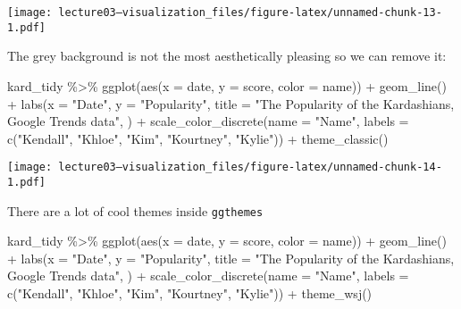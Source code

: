 \documentclass[
]{article}
\newenvironment{Shaded}{\begin{snugshade}}{\end{snugshade}}
\newcommand{\AttributeTok}[1]{\textcolor[rgb]{0.77,0.63,0.00}{#1}}
\newcommand{\FunctionTok}[1]{\textcolor[rgb]{0.00,0.00,0.00}{#1}}
\newcommand{\NormalTok}[1]{#1}
\newcommand{\SpecialCharTok}[1]{\textcolor[rgb]{0.00,0.00,0.00}{#1}}
\newcommand{\StringTok}[1]{\textcolor[rgb]{0.31,0.60,0.02}{#1}}
\begin{document}
\texttt{[image: lecture03---visualization\_files/figure-latex/unnamed-chunk-13-1.pdf]}

The grey background is not the most aesthetically pleasing so we can
remove it:

\begin{Shaded}
\begin{Highlighting}[]
\NormalTok{kard\_tidy }\SpecialCharTok{\%\textgreater{}\%} 
  \FunctionTok{ggplot}\NormalTok{(}\FunctionTok{aes}\NormalTok{(}\AttributeTok{x =}\NormalTok{ date, }\AttributeTok{y =}\NormalTok{ score, }\AttributeTok{color =}\NormalTok{ name)) }\SpecialCharTok{+}
  \FunctionTok{geom\_line}\NormalTok{() }\SpecialCharTok{+}
  \FunctionTok{labs}\NormalTok{(}\AttributeTok{x =} \StringTok{"Date"}\NormalTok{,}
       \AttributeTok{y =} \StringTok{"Popularity"}\NormalTok{,}
       \AttributeTok{title =} \StringTok{"The Popularity of the Kardashians, Google Trends data"}\NormalTok{,}
\NormalTok{       ) }\SpecialCharTok{+}
  \FunctionTok{scale\_color\_discrete}\NormalTok{(}\AttributeTok{name =} \StringTok{"Name"}\NormalTok{,}
                       \AttributeTok{labels =} \FunctionTok{c}\NormalTok{(}\StringTok{"Kendall"}\NormalTok{, }\StringTok{"Khloe"}\NormalTok{, }\StringTok{"Kim"}\NormalTok{, }\StringTok{"Kourtney"}\NormalTok{, }\StringTok{"Kylie"}\NormalTok{)) }\SpecialCharTok{+}
  \FunctionTok{theme\_classic}\NormalTok{()}
\end{Highlighting}
\end{Shaded}

\texttt{[image: lecture03---visualization\_files/figure-latex/unnamed-chunk-14-1.pdf]}

There are a lot of cool themes inside \texttt{ggthemes}

\begin{Shaded}
\begin{Highlighting}[]
\NormalTok{kard\_tidy }\SpecialCharTok{\%\textgreater{}\%} 
  \FunctionTok{ggplot}\NormalTok{(}\FunctionTok{aes}\NormalTok{(}\AttributeTok{x =}\NormalTok{ date, }\AttributeTok{y =}\NormalTok{ score, }\AttributeTok{color =}\NormalTok{ name)) }\SpecialCharTok{+}
  \FunctionTok{geom\_line}\NormalTok{() }\SpecialCharTok{+}
  \FunctionTok{labs}\NormalTok{(}\AttributeTok{x =} \StringTok{"Date"}\NormalTok{,}
       \AttributeTok{y =} \StringTok{"Popularity"}\NormalTok{,}
       \AttributeTok{title =} \StringTok{"The Popularity of the Kardashians, Google Trends data"}\NormalTok{,}
\NormalTok{       ) }\SpecialCharTok{+}
  \FunctionTok{scale\_color\_discrete}\NormalTok{(}\AttributeTok{name =} \StringTok{"Name"}\NormalTok{,}
                       \AttributeTok{labels =} \FunctionTok{c}\NormalTok{(}\StringTok{"Kendall"}\NormalTok{, }\StringTok{"Khloe"}\NormalTok{, }\StringTok{"Kim"}\NormalTok{, }\StringTok{"Kourtney"}\NormalTok{, }\StringTok{"Kylie"}\NormalTok{)) }\SpecialCharTok{+}
  \FunctionTok{theme\_wsj}\NormalTok{()}
\end{Highlighting}
\end{Shaded}
\end{document}
